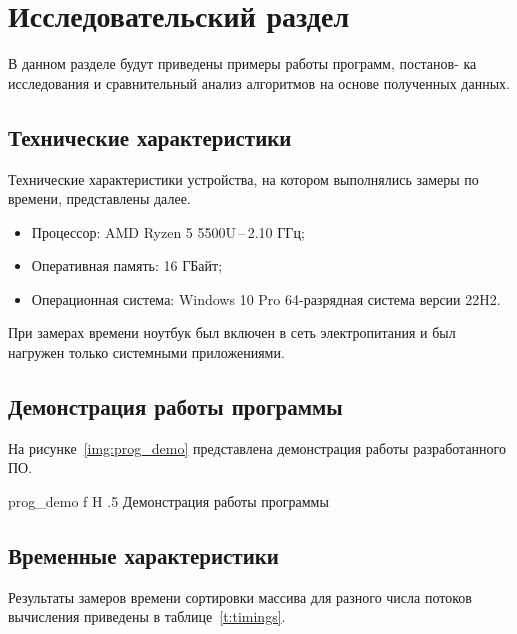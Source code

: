 \chapter{Исследовательский раздел}
В данном разделе будут приведены примеры работы программ, постанов-
ка исследования и сравнительный анализ алгоритмов на основе полученных
данных.

\section{Технические характеристики}
Технические характеристики устройства, на котором выполнялись замеры по времени, представлены далее.
\begin{itemize}
	\item Процессор: AMD Ryzen 5 5500U\,--\,2.10 ГГц;
	\item Оперативная память: 16 ГБайт;
	\item Операционная система: Windows 10 Pro 64-разрядная система версии 22H2.
\end{itemize}
При замерах времени ноутбук был включен в сеть электропитания и был нагружен только системными приложениями.

\section{Демонстрация работы программы}
На рисунке~\ref{img:prog_demo} представлена демонстрация работы разработанного ПО.  

{prog_demo}
{f}
{H}
{.5\textwidth}
{Демонстрация работы программы}

\section{Временные характеристики}
Результаты замеров времени сортировки массива для разного числа потоков вычисления приведены в таблице~\ref{t:timings}.

\newpage


